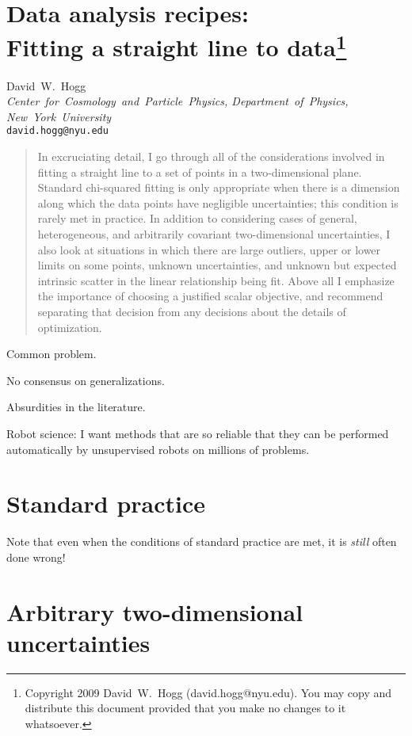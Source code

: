 \documentclass[12pt]{article}
\begin{document}
\section*{Data analysis recipes:\ \\
  Fitting a straight line to data\footnote{
    Copyright 2009 David~W.~Hogg (david.hogg@nyu.edu).  You may copy
    and distribute this document provided that you make no changes to
    it whatsoever.}}

\noindent
David~W.~Hogg\\
\textsl{Center~for~Cosmology~and~Particle~Physics, Department~of~Physics,\\
New~York~University}\\
\texttt{david.hogg@nyu.edu}

\begin{abstract}
  In excruciating detail, I go through all of the considerations
  involved in fitting a straight line to a set of points in a
  two-dimensional plane.  Standard chi-squared fitting is only
  appropriate when there is a dimension along which the data points
  have negligible uncertainties; this condition is rarely met in
  practice.  In addition to considering cases of general,
  heterogeneous, and arbitrarily covariant two-dimensional
  uncertainties, I also look at situations in which there are large
  outliers, upper or lower limits on some points, unknown
  uncertainties, and unknown but expected intrinsic scatter in the
  linear relationship being fit.  Above all I emphasize the importance
  of choosing a justified scalar objective, and recommend separating
  that decision from any decisions about the details of optimization.
\end{abstract}

Common problem.

No consensus on generalizations.

Absurdities in the literature.

Robot science: I want methods that are so reliable that they can be
performed automatically by unsupervised robots on millions of
problems.

\section{Standard practice}

Note that even when the conditions of standard practice are met, it is
\emph{still} often done wrong!

\section{Arbitrary two-dimensional uncertainties}
\end{document}
